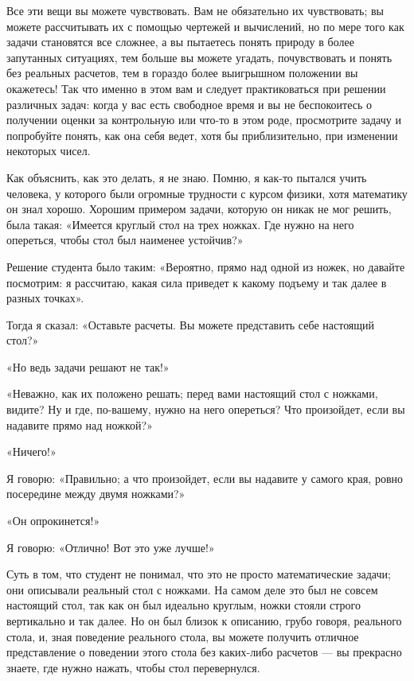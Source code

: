 \documentclass[10pt,oneside]{article}
\newcommand{\TipsRunning}[1]{\par\vspace{2bp}{\centering\footnotesize #1\par}\vspace{2bp}}
\begin{document}
Все эти вещи вы можете чувствовать. Вам не обязательно их чувствовать; вы можете рассчитывать их с помощью чертежей и вычислений, но по мере того как задачи становятся все сложнее, а вы пытаетесь понять природу в более запутанных ситуациях, тем больше вы можете угадать, почувствовать и понять без реальных расчетов, тем в гораздо более выигрышном положении вы окажетесь! Так что именно в этом вам и следует практиковаться при решении различных задач: когда у вас есть свободное время и вы не беспокоитесь о получении оценки за контрольную или что-то в этом роде, просмотрите задачу и попробуйте понять, как она себя ведет, хотя бы приблизительно, при изменении некоторых чисел.\par

\TipsRunning{З А К О Н Ы  И  И Н Т У И Ц И Я • 7 3}

Как объяснить, как это делать, я не знаю. Помню, я как-то пытался учить человека, у которого были огромные трудности с курсом физики, хотя математику он знал хорошо. Хорошим примером задачи, которую он никак не мог решить, была такая: «Имеется круглый стол на трех ножках. Где нужно на него опереться, чтобы стол был наименее устойчив?»\par

Решение студента было таким: «Вероятно, прямо над одной из ножек, но давайте посмотрим: я рассчитаю, какая сила приведет к какому подъему и так далее в разных точках».\par

Тогда я сказал: «Оставьте расчеты. Вы можете представить себе настоящий стол?»\par

«Но ведь задачи решают не так!»\par

«Неважно, как их положено решать; перед вами настоящий стол с ножками, видите? Ну и где, по-вашему, нужно на него опереться? Что произойдет, если вы надавите прямо над ножкой?»\par

«Ничего!»\par

Я говорю: «Правильно; а что произойдет, если вы надавите у самого края, ровно посередине между двумя ножками?»\par

«Он опрокинется!»\par

Я говорю: «Отлично! Вот это уже лучше!»\par

Суть в том, что студент не понимал, что это не просто математические задачи; они описывали реальный стол с ножками. На самом деле это был не совсем настоящий стол, так как он был идеально круглым, ножки стояли строго вертикально и так далее. Но он был близок к описанию, грубо говоря, реального стола, и, зная поведение реального стола, вы можете получить отличное представление о поведении этого стола без каких-либо расчетов --- вы прекрасно знаете, где нужно нажать, чтобы стол перевернулся.\par
\end{document}
